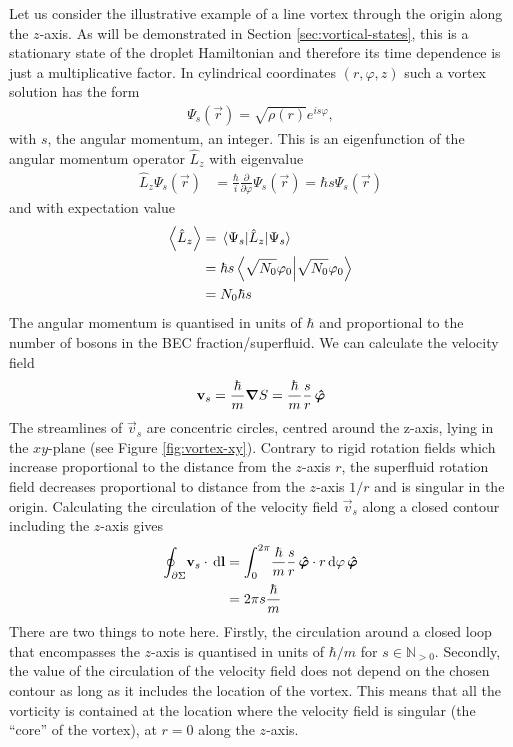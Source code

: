 			Let us consider the illustrative example of a line vortex through the origin along the $z$-axis. As will be demonstrated in Section \ref{sec:vortical-states}, this is a stationary state of the droplet Hamiltonian and therefore its time dependence is just a multiplicative factor. In cylindrical coordinates $(r,\varphi,z)$ such a vortex solution has the form
			\begin{align}
				\Psi_s(\vec{r}) = \sqrt{\rho(r)}\unit{e}^{is\varphi}, \label{eq:line-vortex}
			\end{align}
			with $s$, the angular momentum, an integer. This is an eigenfunction of the angular momentum operator $\hat{L}_z$ with eigenvalue
			\begin{align}
				\hat{L}_z \Psi_s(\vec{r}) &= \frac{\hbar}{i}\frac{\partial}{\partial\varphi}\Psi_s(\vec{r}) = \hbar s\Psi_s(\vec{r})
			\end{align}
			and with expectation value
			\begin{align}
				\expval{\hat{L}_z} &= \expval{\hat{L}_z}{\Psi_s} \\
					&= \hbar s \braket{\sqrt{N_0}\varphi_0} \\
					&= N_0\hbar s
			\end{align}
			The angular momentum is quantised in units of $\hbar$ and proportional to the number of bosons in the BEC fraction/superfluid. We can calculate the velocity field
			\begin{align}
				\bm{\mathrm{v}}_s = \frac{\hbar}{m}\grad{S} = \frac{\hbar}{m}\frac{s}{r}\,\vu*{\varphi}
			\end{align}
			The streamlines of $\vec{v}_s$ are concentric circles, centred around the z-axis, lying in the $xy$-plane (see Figure \ref{fig:vortex-xy}). Contrary to rigid rotation fields which increase proportional to the distance from the $z$-axis $r$, the superfluid rotation field decreases proportional to distance from the $z$-axis $1/r$ and is singular in the origin. Calculating the circulation of the velocity field $\vec{v}_s$ along a closed contour including the $z$-axis gives
			\begin{align}
				\oint_{\partial\Sigma}\!\bm{\mathrm{v}}_s\cdot\,\mathrm{d}\bm{\mathrm{l}} &=
				\int_{0}^{2\pi}\!\frac{\hbar}{m}\frac{s}{r}\,\vu*{\varphi}\cdot r\,\mathrm{d}\varphi\,\vu*{\varphi} \\
					&= 2\pi s\frac{\hbar}{m}
			\end{align}
			There are two things to note here. Firstly, the circulation around a closed loop that encompasses the $z$-axis is quantised in units of $\hbar/m$ for $s\in\mathbb{N}_{>0}$. Secondly, the value of the circulation of the velocity field does not depend on the chosen contour as long as it includes the location of the vortex. This means that all the vorticity is contained at the location where the velocity field is singular (the ``core'' of the vortex), at $r=0$ along the $z$-axis.
			
